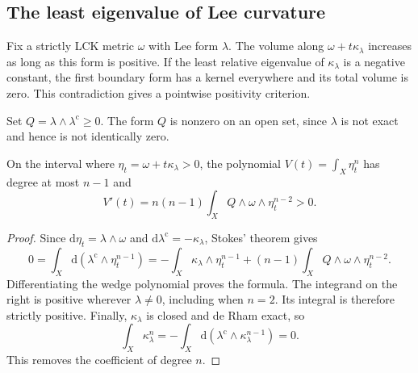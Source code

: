 \subsection{The least eigenvalue of Lee curvature}
\label{subsec:lck-minimum-lee-curvature}

Fix a strictly LCK metric $\omega$ with Lee form $\lambda$.
The volume along $\omega+t\kappa_\lambda$ increases as long
as this form is positive. If the least relative eigenvalue of
$\kappa_\lambda$ is a negative constant, the first boundary
form has a kernel everywhere and its total volume is zero.
This contradiction gives a pointwise positivity criterion.

Set $Q=\lambda\wedge\lambda^{\mathrm c}\geq0$.
The form $Q$ is nonzero on an open set, since $\lambda$ is
not exact and hence is not identically zero.

\begin{proposition}\label{lck:lee-volume-ray}
On the interval where $\eta_t=\omega+t\kappa_\lambda>0$, the
polynomial $V(t)=\int_X\eta_t^n$ has degree at most $n-1$ and
\[
 V'(t)=n(n-1)\int_XQ\wedge\omega\wedge\eta_t^{n-2}>0.
\]
\end{proposition}
\begin{proof}
Since $\mathrm d\eta_t=\lambda\wedge\omega$ and
$\mathrm d\lambda^{\mathrm c}=-\kappa_\lambda$, Stokes' theorem gives
\[
 0=\int_X\mathrm d(\lambda^{\mathrm c}\wedge\eta_t^{n-1})
  =-\int_X\kappa_\lambda\wedge\eta_t^{n-1}
    +(n-1)\int_XQ\wedge\omega\wedge\eta_t^{n-2}.
\]
Differentiating the wedge polynomial proves the formula.
The integrand on the right is positive wherever $\lambda\ne0$,
including when $n=2$. Its integral is therefore strictly positive.
Finally, $\kappa_\lambda$ is closed and de Rham exact, so
\[
 \int_X\kappa_\lambda^n
 =-\int_X\mathrm d(\lambda^{\mathrm c}\wedge
                         \kappa_\lambda^{n-1})=0.
\]
This removes the coefficient of degree $n$.
\end{proof}


